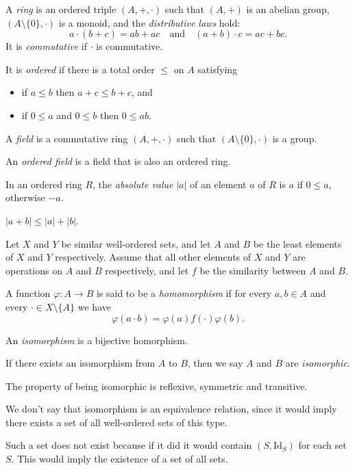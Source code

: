   \begin{defn}
    A \emph{ring} is an ordered triple $(A,+,\cdot)$ such that $(A,+)$ is an
    abelian group, $(A\setminus \{0\},\cdot)$ is a monoid, and the
    \emph{distributive laws} hold:
    \[a\cdot(b+c)=ab+ac\quad\text{and}\quad (a+b)\cdot c=ac+bc.\]
    It is \emph{commutative} if $\cdot$ is commutative.

    It is \emph{ordered} if there is a total order $\le$ on $A$ satisfying
    \begin{itemize}
      \item if $a\le b$ then $a+c\le b+c$, and
      \item if $0\le a$ and $0\le b$ then $0\le ab$.
    \end{itemize}
  \end{defn}
  \begin{defn}
    A \emph{field} is a commutative ring $(A,+,\cdot)$ such that $(A\setminus
    \{0\},\cdot)$ is a group.

    An \emph{ordered field} is a field that is also an ordered ring.
  \end{defn}
  \begin{defn}
    In an ordered ring $R$, the \emph{absolute value} $|a|$ of an element $a$
    of $R$ is $a$ if $0\le a$, otherwise $-a$.
  \end{defn}
  \begin{prop}
    $|a+b|\le|a|+|b|$.
  \end{prop}
  \begin{defn}
    Let $X$ and $Y$ be similar well-ordered sets, and let $A$ and $B$ be the
    least elements of $X$ and $Y$ respectively. Assume that all other elements
    of $X$ and $Y$ are operations on $A$ and $B$ respectively, and let $f$ be
    the similarity between $A$ and $B$.

    A function $\varphi:A\to B$ is said
    to be a \emph{homomorphism} if
    for every $a,b\in A$ and every $\cdot\in X\setminus \{A\}$ we
    have \[\varphi(a\cdot b)=\varphi(a) f(\cdot) \varphi(b).\]

    An \emph{isomorphism} is a bijective homorphism.

    If there exists an isomorphism from $A$ to $B$, then we say $A$ and $B$ are
    \emph{isomorphic}.
  \end{defn}
  \begin{prop}
    The property of being isomorphic is reflexive, symmetric and transitive.
  \end{prop}
  \begin{rem}
    We don't say that isomorphism is an equivalence relation, since it would
    imply there exists a set of all well-ordered sets of this type.

    Such a set does not exist because if it did it would contain
    $(S,\mathrm{Id}_S)$ for each set $S$. This would imply the existence of a
    set of all sets.
  \end{rem}
